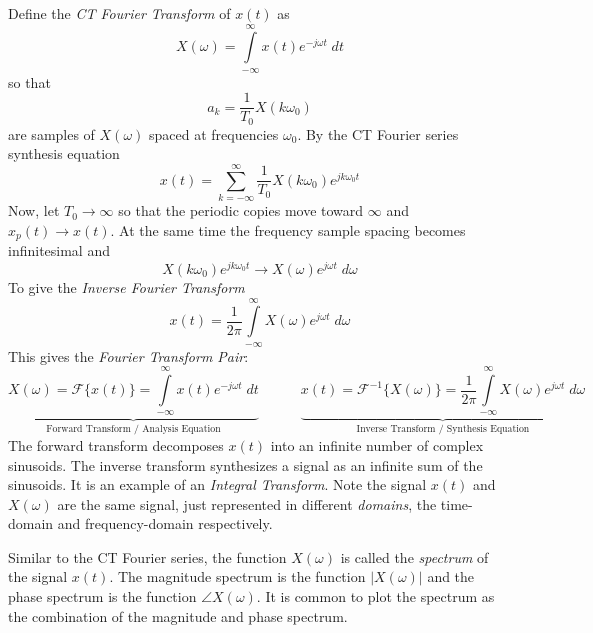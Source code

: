 Define the \emph{CT Fourier Transform} of $x(t)$ as
\[
\boxed{X(\omega) = \int\limits_{-\infty}^{\infty} x(t) e^{-j\omega t}\; dt}
\]
so that
\[
a_k = \frac{1}{T_0} X(k\omega_0)
\]
are samples of $X(\omega)$ spaced at frequencies $\omega_0$. By the CT Fourier series synthesis equation
\[
x(t) = \sum\limits_{k = -\infty}^{\infty} \frac{1}{T_0} X(k\omega_0) e^{jk\omega_0 t} 
\]
Now, let $T_0 \rightarrow \infty$ so that the periodic copies move toward $\infty$ and $x_p(t) \rightarrow x(t)$. At the same time the frequency sample spacing becomes infinitesimal and
\[
X(k\omega_0) e^{jk\omega_0 t} \rightarrow X(\omega) e^{j\omega t}\; d\omega
\]
To give the \emph{Inverse Fourier Transform}
\[
\boxed{x(t) = \frac{1}{2\pi} \int\limits_{-\infty}^{\infty} X(\omega)e^{j\omega t}\; d\omega}
\]
This gives the \emph{Fourier Transform Pair}:
\[
\underbrace{X(\omega) = \mathcal{F}\{x(t)\} = \int\limits_{-\infty}^{\infty} x(t) e^{-j\omega t}\; dt}_{\text{Forward Transform / Analysis Equation}}
\hspace{3em}
\underbrace{x(t) = \mathcal{F}^{-1}\{X(\omega)\} = \frac{1}{2\pi} \int\limits_{-\infty}^{\infty} X(\omega)e^{j\omega t}\; d\omega}_{\text{Inverse Transform / Synthesis Equation}}
\]
The forward transform decomposes $x(t)$ into an infinite number of complex sinusoids. The inverse transform synthesizes a signal as an infinite sum of the sinusoids. It is an example of an \emph{Integral Transform}. Note the signal $x(t)$ and $X(\omega)$ are the same signal, just represented in different \emph{domains}, the time-domain and frequency-domain respectively. 

Similar to the CT Fourier series, the function $X(\omega)$ is called the \emph{spectrum} of the signal $x(t)$. The magnitude spectrum is the function $|X(\omega)|$ and the phase spectrum is the function $\angle X(\omega)$. It is common to plot the spectrum as the combination of the magnitude and phase spectrum.


